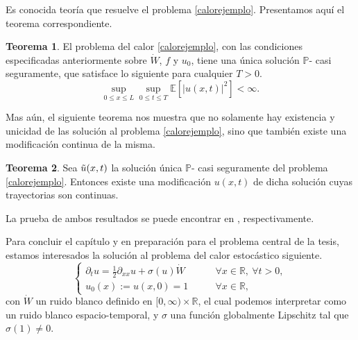\documentclass[letterpaper,twoside,12pt]{book}
\newcommand{\R}{\mathbb{R}}
\newcommand{\E}{\mathbb{E}}
\renewcommand{\P}{\mathbb{P}}
\newcommand{\1}{\mathds{1}}
\newcommand{\abs}[1]{\left\lvert #1 \right\rvert}
\renewcommand{\to}{\rightarrow}
\theoremstyle{definition}
\theoremstyle{definition}
\newtheorem{teo}{Teorema}
\theoremstyle{remark}
\theoremstyle{definition}
\theoremstyle{definition}
\theoremstyle{definition}
\theoremstyle{definition}
\theoremstyle{definition}
\begin{document}
Es conocida teoría que resuelve el problema \eqref{calorejemplo}. Presentamos aquí el teorema correspondiente.

\begin{teo} 
El problema del calor \eqref{calorejemplo}, con las condiciones especificadas anteriormente sobre $\dot W$, $f$ y $u_0$, tiene una única solución $\P$- casi seguramente, que satisface lo siguiente para cualquier $T>0$.
\[
\sup_{0\leq x\leq L}\sup_{0\leq t \leq T}\E\left[\abs{u(x,t)}^2\right]<\infty.   
\]
\end{teo}
Mas aún, el siguiente teorema nos muestra que no solamente hay existencia y unicidad de las solución al problema \eqref{calorejemplo}, sino que también existe una modificación continua de la misma.

\begin{teo} 
Sea $\Tilde{u}(x,t)$ la solución única $\P$- casi seguramente del problema \eqref{calorejemplo}. Entonces existe una modificación $u(x,t)$ de dicha solución cuyas trayectorias son continuas.
\end{teo}
La prueba de ambos resultados se puede encontrar en \cite[teorema 6.4, teorema 6.7]{Khoshnevisan2009}, respectivamente.

Para concluir el capítulo y en preparación para el problema central de la tesis, estamos interesados la solución al problema del calor estocástico siguiente.
\begin{equation}\label{shedefinitiva}
   \begin{cases}
      \partial_t u=\frac{1}{2}\partial_{xx}u+\sigma(u)\dot{W} & \qquad \forall x\in \R, \ \forall t>0,\\
      u_0(x):=u(x,0)=1 & \qquad \forall x\in \R,
   \end{cases}
\end{equation}
con $\dot{W}$ un ruido blanco definido en $[0,\infty)\times\R$, el cual podemos interpretar como un ruido blanco espacio-temporal, y $\sigma$ una función globalmente Lipschitz tal que $\sigma(1)\neq 0$.
\end{document}
